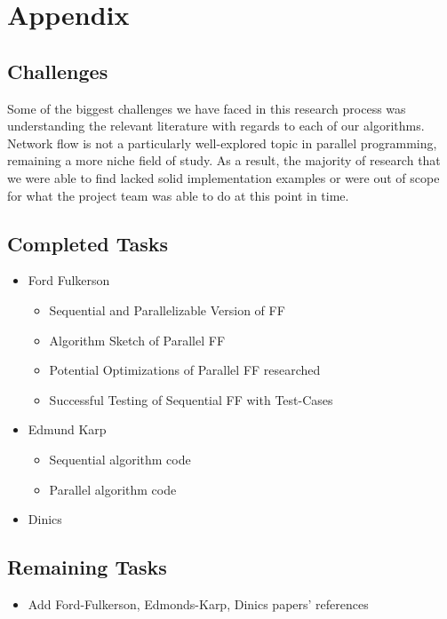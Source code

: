 \section{Appendix}

\subsection{Challenges}
    Some of the biggest challenges we have faced in this research process was understanding the relevant literature with regards to each of our algorithms. Network flow is not a particularly well-explored topic in parallel programming, remaining a more niche field of study. As a result, the majority of research that we were able to find lacked solid implementation examples or were out of scope for what the project team was able to do at this point in time.

\subsection{Completed Tasks}
    \begin{itemize}
        \item Ford Fulkerson
            \begin{itemize}
                \item Sequential and Parallelizable Version of FF
                \item Algorithm Sketch of Parallel FF
                \item Potential Optimizations of Parallel FF researched
                \item Successful Testing of Sequential FF with Test-Cases
            \end{itemize}
        \item Edmund Karp
            \begin{itemize}
                \item Sequential algorithm code
                \item Parallel algorithm code
            \end{itemize}
        \item Dinics
    \end{itemize}
\subsection{Remaining Tasks}
    \begin{itemize}
        \item Add Ford-Fulkerson, Edmonds-Karp, Dinics papers' references
    \end{itemize}
